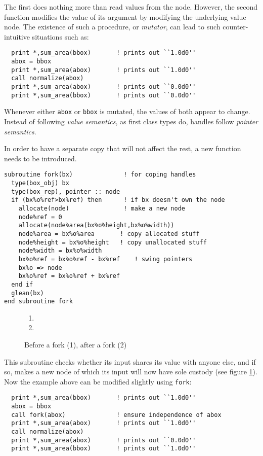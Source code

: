 The first does nothing more than read values from the node.
However, the second function modifies the value of its
argument by modifying the underlying value node.  The existence
of such a procedure, or {\em mutator}, can lead to such
counter-intuitive situations such as:
\begin{verbatim}
  print *,sum_area(bbox)       ! prints out ``1.0d0''
  abox = bbox
  print *,sum_area(abox)       ! prints out ``1.0d0''
  call normalize(abox)
  print *,sum_area(abox)       ! prints out ``0.0d0''
  print *,sum_area(bbox)       ! prints out ``0.0d0''
\end{verbatim}

Whenever either \verb+abox+ or \verb+bbox+ is mutated, the values of
both appear to change.  Instead of following {\em value semantics},
as first class types do, handles follow {\em pointer semantics}.

In order to have a separate copy that will not affect the rest,
a new function needs to be introduced.
\begin{verbatim}
subroutine fork(bx)              ! for coping handles
  type(box_obj) bx
  type(box_rep), pointer :: node
  if (bx%o%ref>bx%ref) then      ! if bx doesn't own the node
    allocate(node)               ! make a new node
    node%ref = 0
    allocate(node%area(bx%o%height,bx%o%width))
    node%area = bx%o%area       ! copy allocated stuff
    node%height = bx%o%height   ! copy unallocated stuff
    node%width = bx%o%width
    bx%o%ref = bx%o%ref - bx%ref    ! swing pointers
    bx%o => node
    bx%o%ref = bx%o%ref + bx%ref
  end if
  glean(bx)
end subroutine fork
\end{verbatim}

\begin{figure}
\begin{center}
\begin{enumerate}
\item {}
\item {}
\end{enumerate}
\caption{Before a fork (1), after a fork (2)}
\label{forkfig}
\end{center}
\end{figure}

This subroutine checks whether its input shares its value with
anyone else, and if so, makes a new node of which its input will now
have sole custody (see figure \ref{forkfig}).  
Now the example above can be
modified slightly using \verb+fork+:
\begin{verbatim}
  print *,sum_area(bbox)       ! prints out ``1.0d0''
  abox = bbox 
  call fork(abox)              ! ensure independence of abox
  print *,sum_area(abox)       ! prints out ``1.0d0''
  call normalize(abox)
  print *,sum_area(abox)       ! prints out ``0.0d0''
  print *,sum_area(bbox)       ! prints out ``1.0d0''
\end{verbatim}

